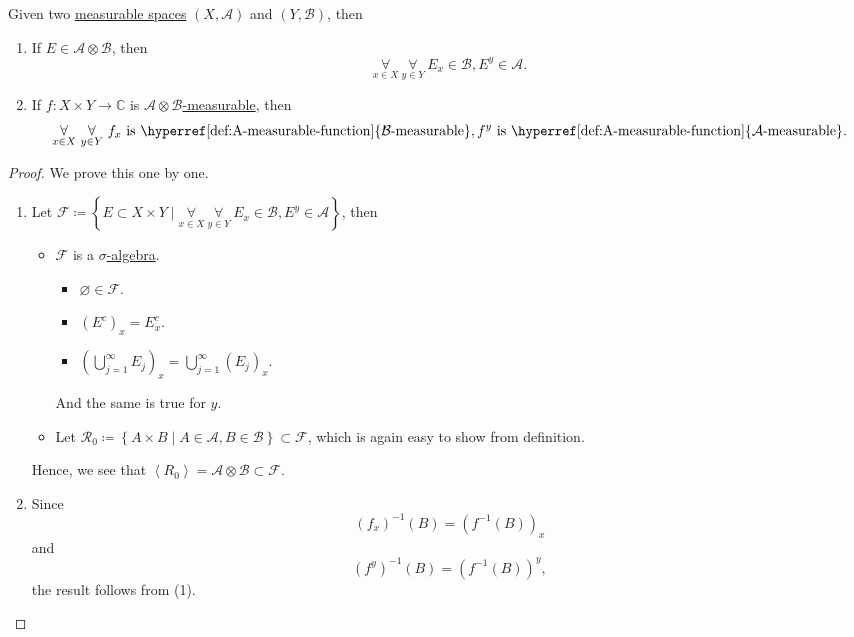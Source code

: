 \begin{proposition}
	Given two \hyperref[def:measurable-space]{measurable spaces} \((X, \mathcal{A} )\) and \((Y, \mathcal{B} )\), then
	\begin{enumerate}[(1)]
		\item If \(E\in \mathcal{A} \otimes \mathcal{B}\), then
		      \[
			      \underset{x\in X}{\forall }\ \underset{y\in Y}{\forall }\ E_x\in \mathcal{B} , E^y\in \mathcal{A}.
		      \]
		\item If \(f\colon X\times Y\to \mathbb{C} \) is \hyperref[def:A-measurable-function]{\(\mathcal{A} \otimes \mathcal{B} \)-measurable}, then
		      \[
			      \underset{x\in X}{\forall }\ \underset{y\in Y}{\forall }\ f_x \text{ is \hyperref[def:A-measurable-function]{\(\mathcal{B}\)-measurable}}, f^y \text{ is \hyperref[def:A-measurable-function]{\(\mathcal{A}\)-measurable}}.
		      \]
	\end{enumerate}
\end{proposition}
\begin{proof}
	We prove this one by one.
	\begin{enumerate}[(1)]
		\item Let \(\mathcal{F} \coloneqq \left\{E\subset X\times Y \mid \underset{x\in X}{\forall }\ \underset{y\in Y}{\forall }\ E_x\in \mathcal{B} , E^y\in \mathcal{A}\right\}\), then
		      \begin{itemize}
			      \item \(\mathcal{F} \) is a \hyperref[def:sigma-algebra]{\(\sigma\)-algebra}.
			            \begin{itemize}
				            \item \(\varnothing \in \mathcal{F} \).
				            \item \((E^{c} )_x = E_{x}^{c}\).
				            \item \(\left(\bigcup_{j=1}^{\infty} E_{j} \right)_x = \bigcup_{j=1}^{\infty} (E_{j} )_{x} \).
			            \end{itemize}
			            And the same is true for \(y\).
			      \item Let \(\mathcal{R} _0 \coloneqq \left\{A\times B \mid A\in \mathcal{A} , B\in \mathcal{B} \right\}\subset \mathcal{F}\), which is again
			            easy to show from definition.
		      \end{itemize}
		      Hence, we see that \(\left< R_0 \right> = \mathcal{A} \otimes \mathcal{B} \subset \mathcal{F} \).
		\item Since
		      \[
			      (f_{x} )^{-1} (B) = (f^{-1} (B))_{x}
		      \]
		      and
		      \[
			      (f^{y} )^{-1} ({B} ) = (f^{-1} (B))^{y},
		      \]
		      the result follows from (1).
	\end{enumerate}
\end{proof}

